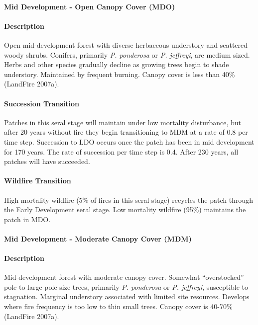 \noindent\hrulefill


\paragraph{Mid Development - Open Canopy Cover (MDO)}

\paragraph{Description} Open mid-development forest with diverse herbaceous understory and scattered woody shrubs. Conifers, primarily \emph{P. ponderosa} or \emph{P. jeffreyi}, are medium sized. Herbs and other species gradually decline as growing trees begin to shade understory. Maintained by frequent burning. Canopy cover is less than 40\% (LandFire 2007a). 

\paragraph{Succession Transition} Patches in this seral stage will maintain under low mortality disturbance, but after 20 years without fire they begin transitioning to MDM at a rate of 0.8 per time step. Succession to LDO occurs once the patch has been in mid development for 170 years. The rate of succession per time step is 0.4. After 230 years, all patches will have succeeded.

\paragraph{Wildfire Transition} High mortality wildfire (5\% of fires in this seral stage) recycles the patch through the Early Development seral stage. Low mortality wildfire (95\%) maintains the patch in MDO.

\noindent\hrulefill

\paragraph{Mid Development - Moderate Canopy Cover (MDM)}

\paragraph{Description} Mid-development forest with moderate canopy cover. Somewhat ``overstocked'' pole to large pole size trees, primarily \emph{P. ponderosa} or \emph{P. jeffreyi}, susceptible to stagnation. Marginal understory associated with limited site resources. Develops where fire frequency is too low to thin small trees. Canopy cover is 40-70\% (LandFire 2007a).

